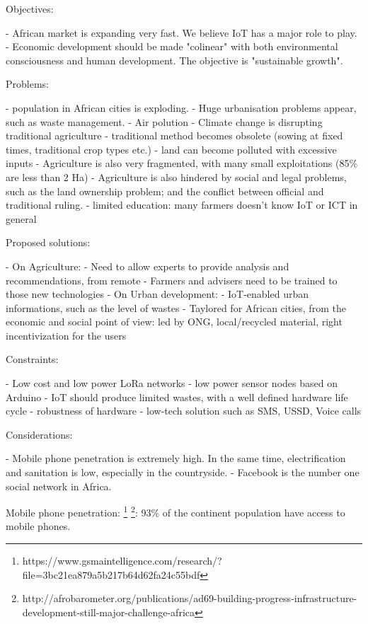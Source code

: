 \documentclass[10pt, conference, compsocconf]{IEEEtran}
\newcommand {\0} {\mathbf 0}
\newcommand {\1} {\mathbf 1}
\begin{document}
\begin{markdown}
Objectives:

- African market is expanding very fast. We believe IoT has a major role to play.
- Economic development should be made "colinear" with both environmental consciousness and human development. The objective is "sustainable growth".

Problems: 

- population in African cities is exploding.
     - Huge urbanisation problems appear, such as waste management.
     - Air polution
- Climate change is disrupting traditional agriculture
     - traditional method becomes obsolete (sowing at fixed times, traditional crop types etc.)
     - land can become polluted with excessive inputs
     - Agriculture is also very fragmented, with many small exploitations (85\% are less than 2 Ha)
     - Agriculture is also hindered by social and legal problems, such as the land ownership problem; and the conflict between official and traditional ruling.
- limited education: many farmers doesn't know IoT or ICT in general

Proposed solutions:

- On Agriculture:
     - Need to allow experts to provide analysis and recommendations, from remote
     - Farmers and advisers need to be trained to those new technologies
- On Urban development:
     - IoT-enabled urban informations, such as the level of wastes
     - Taylored for African cities, from the economic and social point of view: led by ONG, local/recycled material, right incentivization for the users


Constraints:

- Low cost and low power LoRa networks
- low power sensor nodes based on Arduino
- IoT should produce limited wastes, with a well defined hardware life cycle
- robustness of hardware
- low-tech solution such as SMS, USSD, Voice calls

Considerations:

- Mobile phone penetration is extremely high. In the same time, electrification and sanitation is low, especially in the countryside.
- Facebook is the number one social network in Africa. 

     
\end{markdown}
Mobile phone penetration: \footnote{https://www.gsmaintelligence.com/research/?file=3bc21ea879a5b217b64d62fa24c55bdf} \footnote{http://afrobarometer.org/publications/ad69-building-progress-infrastructure-development-still-major-challenge-africa}: 93\% of the continent population have access to mobile phones.
\end{document}
